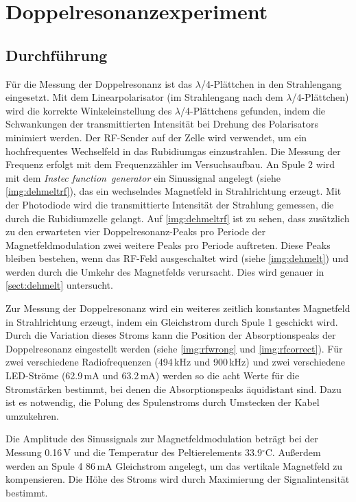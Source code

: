 \section{Doppelresonanzexperiment}
\subsection{Durchführung}
Für die Messung der Doppelresonanz ist das $\lambda$/4-Plättchen in den Strahlengang eingesetzt.
Mit dem Linearpolarisator (im Strahlengang nach dem $\lambda$/4-Plättchen) wird die
korrekte Win\-kel\-ein\-stel\-lung des $\lambda$/4-Plättchens gefunden,
indem die Schwankungen der transmittierten Intensität
bei Drehung des Polarisators minimiert werden.
Der RF-Sender auf der Zelle wird verwendet, um ein hochfrequentes Wechselfeld in das Rubidiumgas einzustrahlen.
Die Messung der Frequenz erfolgt mit dem Frequenzzähler im Versuchsaufbau.
An Spule 2 wird mit dem \emph{Instec function~generator} ein Sinussignal angelegt (siehe \autoref{img:dehmeltrf}),
das ein wechselndes Magnetfeld in Strahlrichtung erzeugt.
Mit der Photodiode wird die transmittierte Intensität der Strahlung gemessen,
die durch die Rubidiumzelle gelangt.
Auf \autoref{img:dehmeltrf} ist zu sehen, dass zusätzlich zu den erwarteten vier Doppelresonanz-Peaks pro
Periode der Magnetfeldmodulation zwei weitere Peaks pro Periode auftreten.
Diese Peaks bleiben bestehen, wenn das RF-Feld ausgeschaltet wird (siehe \autoref{img:dehmelt}) und
werden durch die Umkehr des Magnetfelds verursacht. Dies wird genauer in \autoref{sect:dehmelt} untersucht.

Zur Messung der Doppelresonanz wird ein weiteres zeitlich konstantes Magnetfeld in Strahlrichtung erzeugt,
indem ein Gleichstrom durch Spule 1 geschickt wird.
Durch die Variation dieses Stroms kann die Position der Absorptionspeaks der Doppelresonanz eingestellt werden
(siehe \autoref{img:rfwrong} und \autoref{img:rfcorrect}).
Für zwei verschiedene Radiofrequenzen (494\,kHz und 900\,kHz) und
zwei verschiedene LED-Ströme (62.9\,mA und 63.2\,mA) werden so die acht 
Werte für die Stromstärken bestimmt, bei denen die Absorptionspeaks äquidistant sind.
Dazu ist es notwendig, die Polung des Spulenstroms durch Umstecken der Kabel umzukehren.

Die Amplitude des Sinussignals zur Magnetfeldmodulation beträgt bei der Messung 0.16\,V und
die Temperatur des Peltierelements 33.9$^\circ$C.
Außerdem werden an Spule 4 86\,mA Gleichstrom angelegt, um das vertikale Magnetfeld zu kompensieren.
Die Höhe des Stroms wird durch Maximierung der Signalintensität bestimmt.

